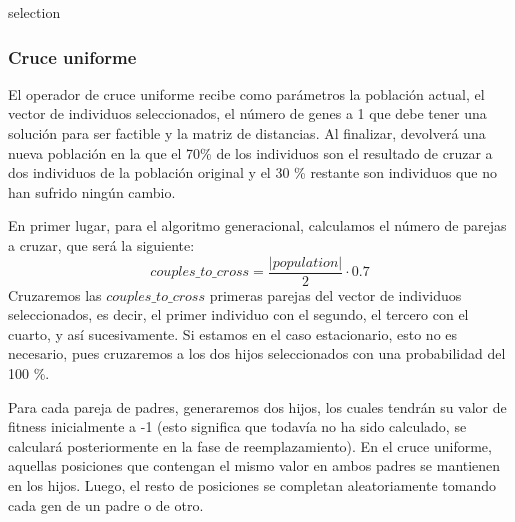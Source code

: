 \documentclass[10pt,a4paper]{article}
\begin{document}
\begin{algorithm}[H]
	\caption{selection}
\end{algorithm}


\subsubsection{Cruce uniforme}

El operador de cruce uniforme recibe como parámetros la población actual, el vector de individuos seleccionados, el número de genes a 1 que debe tener una solución para ser factible y la matriz de distancias. Al finalizar, devolverá una nueva población en la que el 70\% de los individuos son el resultado de cruzar a dos individuos de la población original y el 30 \% restante son individuos que no han sufrido ningún cambio.

En primer lugar, para el algoritmo generacional, calculamos el número de parejas a cruzar, que será la siguiente:
$$couples\_to\_cross = \frac{|population|}{2} \cdot 0.7$$
Cruzaremos las $couples\_to\_cross$ primeras parejas del vector de individuos seleccionados, es decir, el primer individuo con el segundo, el tercero con el cuarto, y así sucesivamente. Si estamos en el caso estacionario, esto no es necesario, pues cruzaremos a los dos hijos seleccionados con una probabilidad del 100 \%.

Para cada pareja de padres, generaremos dos hijos, los cuales tendrán su valor de fitness inicialmente a -1 (esto significa que todavía no ha sido calculado, se calculará posteriormente en la fase de reemplazamiento). En el cruce uniforme, aquellas posiciones que contengan el mismo valor en ambos padres se mantienen en los hijos. Luego, el resto de posiciones se completan aleatoriamente tomando cada gen de un padre o de otro.\\
\end{document}
